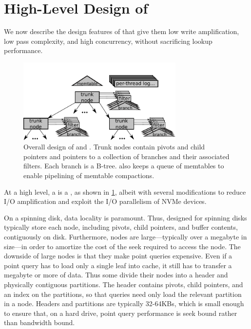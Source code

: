 \section{High-Level Design of \datastructs}\label{sec:design}

We now describe the design features of \datastructs that give them 
low write amplification, low pass complexity, and high
concurrency, without sacrificing lookup performance.

\begin{figure}[t]
  \begin{center}
    \includegraphics[width=3.25in]{figures/stbetree-diagram.pdf}
    \caption{Overall design of \datastructs and \sysname.  Trunk
      nodes contain pivots and child pointers and pointers to a
      collection of branches and their associated filters.  Each branch
      is a B-tree.  \sysname also keeps a queue of memtables to
      enable pipelining of memtable
      compactions.}
    \label{fig:stbetree}
  \end{center}
\end{figure}

At a high level, a \datastruct is a \bet, as shown in
\cref{fig:stbetree}, albeit with several modifications to reduce I/O
amplification and exploit the I/O parallelism of NVMe devices.

On a spinning disk, data locality is paramount.  Thus, \bets designed
for spinning disks typically store each node, including pivots, child
pointers, and buffer contents, contiguously on disk.  Furthermore,
nodes are large---typically over a megabyte in size---in order to
amortize the cost of the seek required to access the node.  The
downside of large nodes is that they make point queries expensive.
Even if a point query has to load only a single leaf into cache, it
still has to transfer a megabyte or more of data.  Thus some \bets
divide their nodes into a header and physically contiguous
partitions.  The header contains pivots, child pointers, and an
index on the partitions, so that queries need only load the relevant
partition in a node.  Headers and partitions are typically 32-64KBs,
which is small enough to ensure that, on a hard drive, point query performance is seek
bound rather than bandwidth bound.

